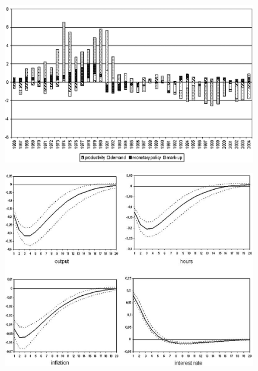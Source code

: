 \documentclass{beamer}
\begin{document}
\begin{frame}
  \begin{figure}
    \includegraphics{sw_figure4_inflation.eps}
  \end{figure}
\end{frame}

\begin{frame}
  \begin{figure}
    \includegraphics{sw_figure6.eps}
  \end{figure}
\end{frame}


\end{document}

